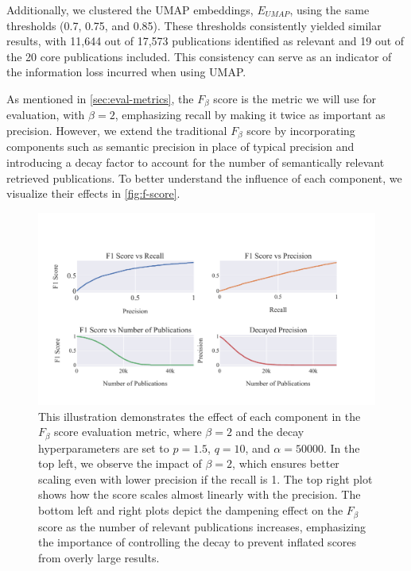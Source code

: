 Additionally, we clustered the UMAP embeddings, $E_{UMAP}$, using the same thresholds (0.7, 0.75, and 0.85). These thresholds consistently yielded similar results, with 11,644 out of 17,573 publications identified as relevant and 19 out of the 20 core publications included. This consistency can serve as an indicator of the information loss incurred when using UMAP.

As mentioned in \autoref{sec:eval-metrics}, the $F_{\beta}$ score is the metric we will use for evaluation, with $\beta=2$, emphasizing recall by making it twice as important as precision. However, we extend the traditional $F_{\beta}$ score by incorporating components such as semantic precision in place of typical precision and introducing a decay factor to account for the number of semantically relevant retrieved publications. To better understand the influence of each component, we visualize their effects in \autoref{fig:f-score}.

\begin{figure}[!hb]
	\centering	
	\includegraphics[scale=0.7]{pics/f_score.pdf}
	\caption[$F_{\beta}$ components analysis]{This illustration demonstrates the effect of each component in the $F_{\beta}$ score evaluation metric, where $\beta=2$ and the decay hyperparameters are set to $p=1.5$, $q=10$, and $\alpha=50000$. In the top left, we observe the impact of $\beta=2$, which ensures better scaling even with lower precision if the recall is 1. The top right plot shows how the score scales almost linearly with the precision. The bottom left and right plots depict the dampening effect on the $F_{\beta}$ score as the number of relevant publications increases, emphasizing the importance of controlling the decay to prevent inflated scores from overly large results.}\label{fig:f-score}
\end{figure}

